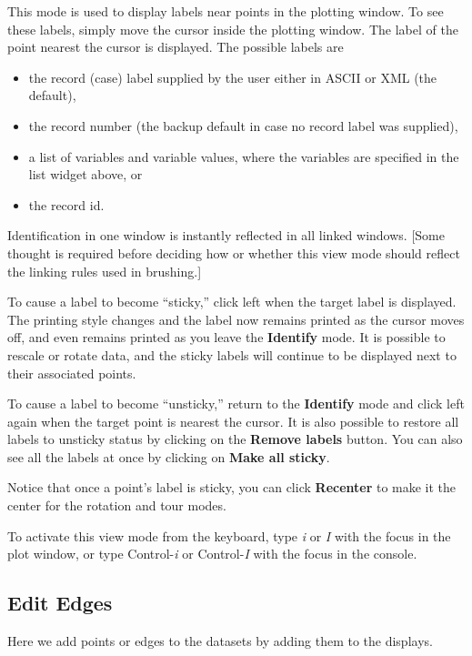\documentclass[11pt]{article}
\begin{document}
This mode is used to display labels near points in the plotting window.
To see these labels, simply move the cursor inside the plotting window.
The label of the point nearest the cursor is displayed.  The possible
labels are

\begin{itemize} \itemsep 0em
\item the record (case) label supplied by the user either in ASCII
      or XML (the default),
\item the record number (the backup default in case no record label was
      supplied),
\item a list of variables and variable values, where the variables are
      specified in the list widget above, or
\item the record id.
\end{itemize}

Identification in one window is instantly reflected in all linked windows.
[Some thought is required before deciding how or whether this view mode
should reflect the linking rules used in brushing.]

To cause a label to become ``sticky,'' click left when the target
label is displayed.  The printing style changes and the label now
remains printed as the cursor moves off, and even remains printed as
you leave the {\bf Identify} mode.  It is possible to rescale or
rotate data, and the sticky labels will continue to be displayed next
to their associated points.

To cause a label to become ``unsticky,'' return to the {\bf Identify}
mode and click left again when the target point is nearest the
cursor.  It is also possible to restore all labels to unsticky status
by clicking on the {\bf Remove labels} button.  You can also see all
the labels at once by clicking on {\bf Make all sticky}.

Notice that once a point's label is sticky, you can click {\bf Recenter}
to make it the center for the rotation and tour modes.

To activate this view mode from the keyboard, type {\em i} or {\em I}
with the focus in the plot window, or type Control-{\em i} or
Control-{\em I} with the focus in the console.

\subsection{Edit Edges}
\label{slbl:EditEdges}

Here we add points or edges to the datasets by adding them to
the displays.  
\end{document}
